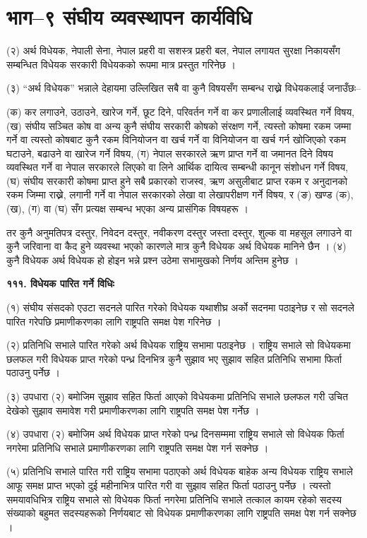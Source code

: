 \section{भाग–९ संघीय व्यवस्थापन कार्यविधि}

(२) अर्थ विधेयक, नेपाली सेना, नेपाल प्रहरी वा सशस्त्र प्रहरी बल, नेपाल लगायत सुरक्षा निकायसँग सम्बन्धित विधेयक सरकारी विधेयकको रूपमा मात्र प्रस्तुत गरिनेछ ।

(३) “अर्थ विधेयक” भन्नाले देहायमा उल्लिखित सबै वा कुनै विषयसँग सम्बन्ध राख्ने विधेयकलाई जनाउँछः–

(क) कर लगाउने, उठाउने, खारेज गर्ने, छूट दिने, परिवर्तन गर्ने वा कर प्रणालीलाई व्यवस्थित गर्ने विषय,
(ख) संघीय सञ्चित कोष वा अन्य कुनै संघीय सरकारी कोषको संरक्षण गर्ने, त्यस्तो कोषमा रकम जम्मा गर्ने वा त्यस्तो कोषबाट कुनै रकम विनियोजन वा खर्च गर्ने वा विनियोजन वा खर्च गर्न खोजिएको रकम घटाउने, बढाउने वा खारेज गर्ने विषय,
(ग) नेपाल सरकारले ऋण प्राप्त गर्ने वा जमानत दिने विषय व्यवस्थित गर्ने वा नेपाल सरकारले लिएको वा लिने आर्थिक दायित्व सम्बन्धी कानून संशोधन गर्ने विषय,
(घ) संघीय सरकारी कोषमा प्राप्त हुने सबै प्रकारको राजस्व, ऋण असुलीबाट प्राप्त रकम र अनुदानको रकम जिम्मा राख्ने, लगानी गर्ने वा नेपाल सरकारको लेखा वा लेखापरीक्षण गर्ने विषय, र
(ङ) खण्ड (क), (ख), (ग) वा (घ) सँग प्रत्यक्ष सम्बन्ध भएका अन्य प्रासंगिक विषयहरू ।

तर कुनै अनुमतिपत्र दस्तुर, निवेदन दस्तुर, नवीकरण दस्तुर जस्ता दस्तुर, शुल्क वा महसूल लगाउने वा कुनै जरिवाना वा कैद हुने व्यवस्था भएको कारणले मात्र कुनै विधेयक अर्थ विधेयक मानिने छैन ।
(४) कुनै विधेयक अर्थ विधेयक हो होइन भन्ने प्रश्न उठेमा सभामुखको निर्णय अन्तिम हुनेछ ।

\textbf{१११. विधेयक पारित गर्ने विधिः}

(१) संघीय संसदको एउटा सदनले पारित गरेको विधेयक यथाशीघ्र अर्को सदनमा पठाइनेछ र सो सदनले पारित गरेपछि प्रमाणीकरणका लागि राष्ट्रपति समक्ष पेश गरिनेछ ।

(२) प्रतिनिधि सभाले पारित गरेको अर्थ विधेयक राष्ट्रिय सभामा पठाइनेछ । राष्ट्रिय सभाले सो विधेयकमा छलफल गरी विधेयक प्राप्त गरेको पन्ध्र दिनभित्र कुनै सुझाव भए सुझाव सहित प्रतिनिधि सभामा फिर्ता पठाउनु पर्नेछ ।

(३) उपधारा (२) बमोजिम सुझाव सहित फिर्ता आएको विधेयकमा प्रतिनिधि सभाले छलफल गरी उचित देखेको सुझाव समावेश गरी प्रमाणीकरणका लागि राष्ट्रपति समक्ष पेश गर्नेछ ।

(४) उपधारा (२) बमोजिम अर्थ विधेयक प्राप्त गरेको पन्ध्र दिनसम्ममा राष्ट्रिय सभाले सो विधेयक फिर्ता नगरेमा प्रतिनिधि सभाले प्रमाणीकरणका लागि राष्ट्रपति समक्ष पेश गर्न सक्नेछ ।

(५) प्रतिनिधि सभाले पारित गरी राष्ट्रिय सभामा पठाएको अर्थ विधेयक बाहेक अन्य विधेयक राष्ट्रिय सभाले आफू समक्ष प्राप्त भएको दुई
महीनाभित्र पारित गरी वा सुझाव सहित फिर्ता पठाउनु पर्नेछ । त्यस्तो समयावधिभित्र राष्ट्रिय सभाले सो विधेयक फिर्ता नगरेमा प्रतिनिधि सभाले तत्काल कायम रहेको सदस्य संख्याको बहुमत सदस्यहरूको निर्णयबाट सो विधेयक प्रमाणीकरणका लागि राष्ट्रपति समक्ष पेश गर्न सक्नेछ ।


